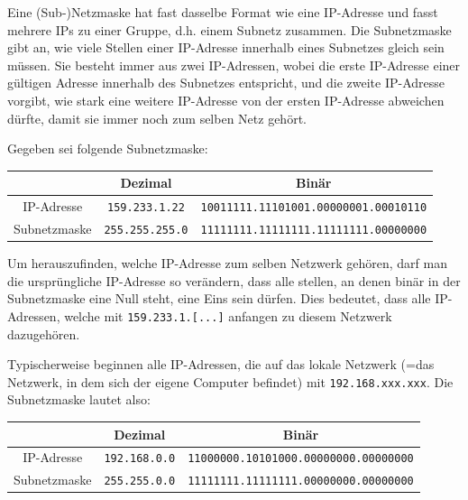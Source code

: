 Eine (Sub-)Netzmaske hat fast dasselbe Format wie eine IP-Adresse und fasst mehrere IPs zu einer Gruppe, d.h. einem Subnetz zusammen. Die Subnetzmaske gibt an, wie viele Stellen einer IP-Adresse innerhalb eines Subnetzes gleich sein müssen. Sie besteht immer aus zwei IP-Adressen, wobei die erste IP-Adresse einer gültigen Adresse innerhalb des Subnetzes entspricht, und die zweite IP-Adresse vorgibt, wie stark eine weitere IP-Adresse von der ersten IP-Adresse abweichen dürfte, damit sie immer noch zum selben Netz gehört.

\begin{myexample}
Gegeben sei folgende Subnetzmaske:
\begin{table}[H]
\centering
\begin{tabular}{ccc}
& Dezimal & Binär\\\midrule\midrule
\gls{IP}-Adresse & \texttt{159.233.1.22} & \texttt{10011111.11101001.00000001.00010110}\\\midrule
Subnetzmaske & \texttt{255.255.255.0}& \texttt{11111111.11111111.11111111.00000000}
\end{tabular}
\end{table}
Um herauszufinden, welche IP-Adresse zum selben Netzwerk gehören, darf man die ursprüngliche IP-Adresse so verändern, dass alle stellen, an denen binär in der Subnetzmaske eine Null steht, eine Eins sein dürfen. Dies bedeutet, dass alle \gls{IP}-Adressen, welche mit \texttt{159.233.1.[...]} anfangen zu diesem Netzwerk dazugehören.
\end{myexample}

\begin{myexample}\label{ex:localhost}
Typischerweise beginnen alle IP-Adressen, die auf das lokale Netzwerk (=das Netzwerk, in dem sich der eigene Computer befindet) mit \texttt{192.168.xxx.xxx}. Die Subnetzmaske lautet also:
\begin{table}[H]
\centering
\begin{tabular}{ccc}
& Dezimal & Binär\\\midrule\midrule
\gls{IP}-Adresse & \texttt{192.168.0.0} & \texttt{11000000.10101000.00000000.00000000}\\\midrule
Subnetzmaske & \texttt{255.255.0.0}& \texttt{11111111.11111111.00000000.00000000}
\end{tabular}
\end{table}
\end{myexample}


